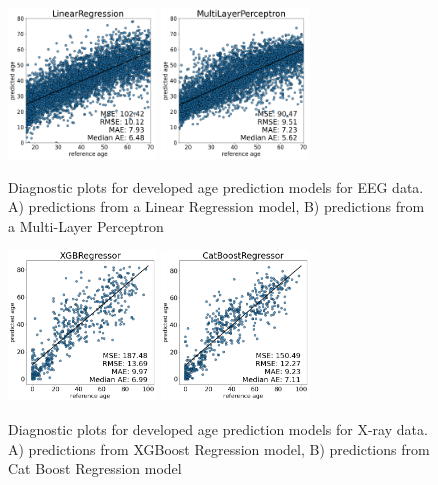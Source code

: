 \documentclass[letterpaper]{article} %
\begin{document}
\begin{figure}
\centering
    \includegraphics[width=0.35\textwidth]{images/linreg_new.png}
    \includegraphics[width=0.35\textwidth]{images/mlp_new.png}
\caption{
Diagnostic plots for developed age prediction models for EEG data. A) predictions from a Linear Regression model, B) predictions from a Multi-Layer Perceptron}
\label{fig:eeg-models}

\vspace{0.5cm}

\centering
    \includegraphics[width=0.35\textwidth]{images/xrayage.png}
    \includegraphics[width=0.35\textwidth]{images/xrayage2.png}
\caption{
Diagnostic plots for developed age prediction models for X-ray data. 
A) predictions from XGBoost Regression model, B) predictions from Cat Boost Regression model}
\label{fig:xray-models}
\end{figure}
\end{document}
